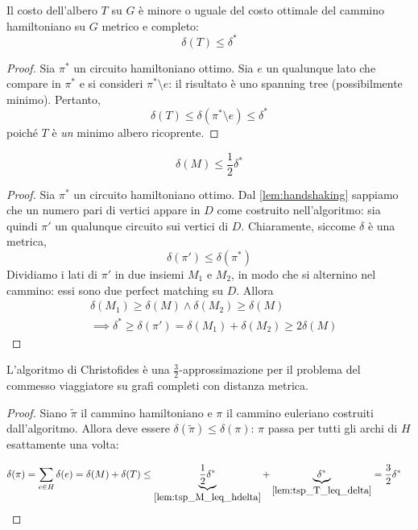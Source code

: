 \begin{lemma}\label{lem:tsp_T_leq_delta}
	Il costo dell'albero $T$ su $G$ è minore o uguale del costo ottimale del cammino hamiltoniano su $G$ metrico
	e completo:
	$$
		\delta(T) \leq \delta^*
	$$
\end{lemma}

\begin{proof}
	Sia $\pi^*$ un circuito hamiltoniano ottimo. Sia $e$ un qualunque lato che compare in $\pi^*$ e si
	consideri $\pi^* \setminus e$: il risultato è uno spanning tree (possibilmente minimo). Pertanto,
	$$
		\delta(T) \leq \delta(\pi^* \setminus e) \leq \delta^*
	$$
	poiché $T$ è \textit{un} minimo albero ricoprente.
\end{proof}
\begin{lemma}\label{lem:tsp_M_leq_hdelta}
	$$
		\delta(M) \leq \frac{1}{2}\delta^*
	$$
\end{lemma}
\begin{proof}
	Sia $\pi^*$ un circuito hamiltoniano ottimo.
	Dal \cref{lem:handshaking} sappiamo che un numero pari di vertici appare in $D$ come costruito
	nell'algoritmo: sia quindi $\pi'$ un qualunque circuito sui vertici di $D$.
	Chiaramente, siccome $\delta$ è una metrica,
	$$
		\delta(\pi') \leq \delta(\pi^*)
	$$
	Dividiamo i lati di $\pi'$ in due insiemi $M_1$ e $M_2$, in modo che si
	alternino nel cammino: essi sono due perfect matching su $D$. Allora
	\begin{align*}
		 & \delta(M_1) \geq \delta(M) \land \delta(M_2) \geq \delta(M)                      \\
		 & \implies \delta^* \geq \delta(\pi') = \delta(M_1) + \delta(M_2) \geq 2 \delta(M)
	\end{align*}
\end{proof}
\begin{theorem}
	L'algoritmo di Christofides è una $\frac{3}{2}$-approssimazione per il problema del
	commesso viaggiatore su grafi completi con distanza metrica.
\end{theorem}
\begin{proof}
	Siano $\tilde{\pi}$ il cammino hamiltoniano e $\pi$ il cammino euleriano costruiti dall'algoritmo.
	Allora deve essere $\delta(\tilde{\pi}) \leq \delta(\pi)$: $\pi$ passa per tutti
	gli archi di $H$ esattamente una volta:

	\begin{align*}
		 & \delta(\pi) = \sum_{e \in H} \delta(e)  = \delta(M) + \delta(T) \leq
		\underbrace{\frac{1}{2} \delta^*}_{\cref{lem:tsp_M_leq_hdelta}} +
		\underbrace{\delta^*}_{\cref{lem:tsp_T_leq_delta}}  = \frac{3}{2} \delta^*
	\end{align*}
\end{proof}

